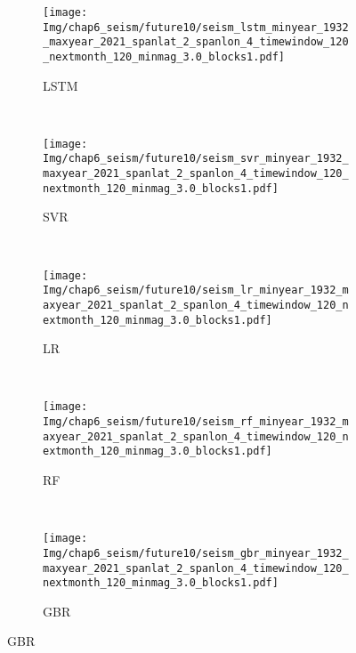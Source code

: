 \begin{figure}[!htbp]
  \vspace{-2cm}
  \centering
  \begin{subfigure}[b]{0.45\textwidth}
    \caption{LSTM}
    \texttt{[image: Img/chap6\_seism/future10/seism\_lstm\_minyear\_1932\_maxyear\_2021\_spanlat\_2\_spanlon\_4\_timewindow\_120\_nextmonth\_120\_minmag\_3.0\_blocks1.pdf]}
    \vspace{-1cm}
    \label{fig:seism_lstm_minyear_1932_maxyear_2021_spanlat_2_spanlon_4_timewindow_120_nextmonth_120_minmag_3.0_blocks1}
  \end{subfigure}
  ~
  \begin{subfigure}[b]{0.45\textwidth}
    \caption{SVR} 
    \texttt{[image: Img/chap6\_seism/future10/seism\_svr\_minyear\_1932\_maxyear\_2021\_spanlat\_2\_spanlon\_4\_timewindow\_120\_nextmonth\_120\_minmag\_3.0\_blocks1.pdf]}
    \vspace{-1cm}
    \label{fig:seism_svr_minyear_1932_maxyear_2021_spanlat_2_spanlon_4_timewindow_120_nextmonth_120_minmag_3.0_blocks1}
  \end{subfigure}   
  \\
  \begin{subfigure}[b]{0.45\textwidth}
      \caption{LR}
      \vspace{-0.2cm}
      \texttt{[image: Img/chap6\_seism/future10/seism\_lr\_minyear\_1932\_maxyear\_2021\_spanlat\_2\_spanlon\_4\_timewindow\_120\_nextmonth\_120\_minmag\_3.0\_blocks1.pdf]}
      \vspace{-1cm}
      \label{fig:seism_lr_minyear_1932_maxyear_2021_spanlat_2_spanlon_4_timewindow_120_nextmonth_120_minmag_3.0_blocks1}
  \end{subfigure}
  ~
  \begin{subfigure}[b]{0.45\textwidth}
    \caption{RF}
    \vspace{-0.2cm}
    \texttt{[image: Img/chap6\_seism/future10/seism\_rf\_minyear\_1932\_maxyear\_2021\_spanlat\_2\_spanlon\_4\_timewindow\_120\_nextmonth\_120\_minmag\_3.0\_blocks1.pdf]}
    \vspace{-1cm}
    \label{fig:seism_rf_minyear_1932_maxyear_2021_spanlat_2_spanlon_4_timewindow_120_nextmonth_120_minmag_3.0_blocks1}
  \end{subfigure}
  \\
  \begin{subfigure}[b]{0.45\textwidth}
    \caption{GBR}
    \vspace{-0.2cm}
    \texttt{[image: Img/chap6\_seism/future10/seism\_gbr\_minyear\_1932\_maxyear\_2021\_spanlat\_2\_spanlon\_4\_timewindow\_120\_nextmonth\_120\_minmag\_3.0\_blocks1.pdf]}

\end{subfigure}
\end{figure}
